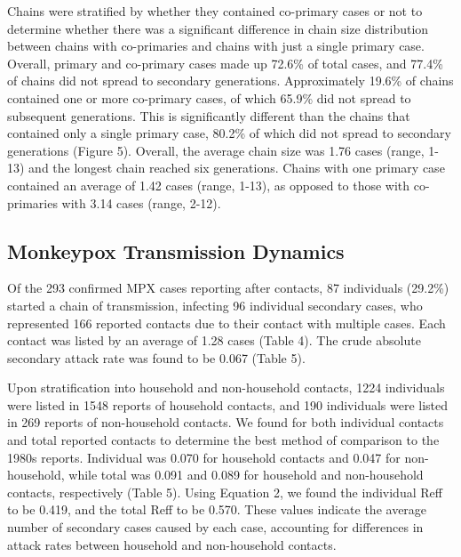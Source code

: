 Chains were stratified by whether they contained co-primary cases or not to determine whether there was a significant difference in chain size distribution between chains with co-primaries and chains with just a single primary case. Overall, primary and co-primary cases made up 72.6\% of total cases, and 77.4\% of chains did not spread to secondary generations. Approximately 19.6\% of chains contained one or more co-primary cases, of which 65.9\% did not spread to subsequent generations. This is significantly different than the chains that contained only a single primary case, 80.2\% of which did not spread to secondary generations (Figure 5). Overall, the average chain size was 1.76 cases (range, 1-13) and the longest chain reached six generations. Chains with one primary case contained an average of 1.42 cases (range, 1-13), as opposed to those with co-primaries with 3.14 cases (range, 2-12). 

\subsection{Monkeypox Transmission Dynamics}
Of the 293 confirmed MPX cases reporting after contacts, 87 individuals (29.2\%) started a chain of transmission, infecting 96 individual secondary cases, who represented 166 reported contacts due to their contact with multiple cases. Each contact was listed by an average of 1.28 cases (Table 4). The crude absolute secondary attack rate was found to be 0.067 (Table 5).

Upon stratification into household and non-household contacts, 1224 individuals were listed in 1548 reports of household contacts, and 190 individuals were listed in 269 reports of non-household contacts. We found for both individual contacts and total reported contacts to determine the best method of comparison to the 1980s reports. Individual was 0.070 for household contacts and 0.047 for non-household, while total was 0.091 and 0.089 for household and non-household contacts, respectively (Table 5). Using Equation 2, we found the individual Reff to be 0.419, and the total Reff to be 0.570. These values indicate the average number of secondary cases caused by each case, accounting for differences in attack rates between household and non-household contacts.